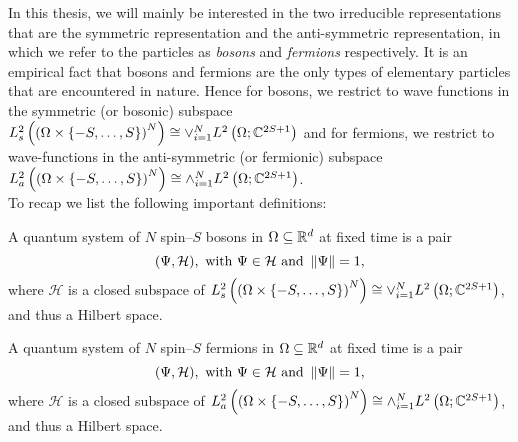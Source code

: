 		In this thesis, we will mainly be interested in the two irreducible representations that are the symmetric representation and the anti-symmetric representation, in which we refer to the particles as \emph{bosons} and \emph{fermions} respectively. It is an empirical fact that bosons and fermions are the only types of elementary particles that are encountered in nature. Hence for bosons, we restrict to wave functions in the symmetric (or bosonic) subspace $ L^2_{s}\left(\left(\Omega\times \{-S,\ldots,S\}\right)^N \right)\cong\vee_{i=1}^{N}L^2\left(\Omega; \mathbb{C}^{2S+1}\right)$ and for fermions, we restrict to wave-functions in the anti-symmetric (or fermionic) subspace\\ $ L^2_{a}\left(\left(\Omega\times \{-S,\ldots,S\}\right)^N \right)\cong\wedge_{i=1}^{N}L^2\left(\Omega; \mathbb{C}^{2S+1}\right)$.\\
		To recap we list the following important definitions:
		\begin{definition}
			A quantum system of $N$ spin--$ S $ bosons in $ \Omega\subseteq\mathbb{R}^d $ at fixed time is a pair
			\begin{equation*}
			(\Psi,\mathcal{H}),\text{ with } \Psi\in\mathcal{H}\text{ and }\left\lVert \Psi \right\rVert=1,
			\end{equation*}
			where $ \mathcal{H} $ is a closed subspace of $ L^2_{s}\left(\left(\Omega\times \{-S,\ldots,S\}\right)^N \right)\cong\vee_{i=1}^{N}L^2\left(\Omega; \mathbb{C}^{2S+1}\right) $, and thus a Hilbert space.
		\end{definition}
		\begin{definition}
			A quantum system of $N$ spin--$ S $ fermions in $ \Omega\subseteq\mathbb{R}^d $ at fixed time is a pair
			\begin{equation*}
			(\Psi,\mathcal{H}),\text{ with } \Psi\in\mathcal{H}\text{ and }\left\lVert \Psi \right\rVert=1,
			\end{equation*}
			where $ \mathcal{H} $ is a closed subspace of $ L^2_{a}\left(\left(\Omega\times \{-S,\ldots,S\}\right)^N \right)\cong\wedge_{i=1}^{N}L^2\left(\Omega; \mathbb{C}^{2S+1}\right) $, and thus a Hilbert space.
		\end{definition}
	
